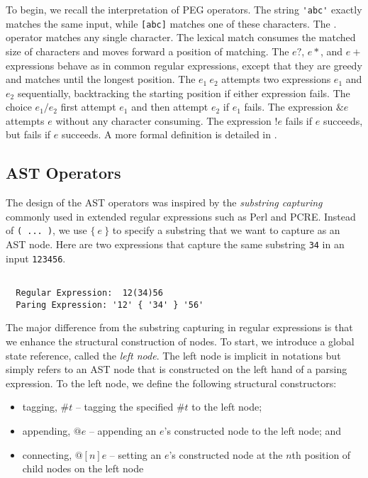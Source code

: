 \documentclass[JIP]{ipsj}
\begin{document}
To begin, we recall the interpretation of PEG operators. The string \verb|'abc'| exactly matches the same input, while \verb|[abc]| matches one of these characters. The . operator matches any single character. The lexical match consumes the matched size of characters and moves forward a position of matching. The $e?$, $e*$, and $e+$ expressions behave as in common regular expressions, except that they are greedy and matches until the longest position. The $e_1 ~ e_2$ attempts two expressions $e_1$ and $e_2$ sequentially, backtracking the starting position if either expression fails.  The choice $e_1 / e_2$ first attempt $e_1$ and then attempt $e_2$ if $e_1$ fails. The expression $\&e$ attempts $e$ without any character consuming. The expression $!e$ fails if $e$ succeeds, but fails if $e$ succeeds. A more formal definition is detailed in \cite{POPL04_PEG}.

\subsection{AST Operators}

The design of the AST operators was inspired by the {\em substring capturing} commonly used in extended regular expressions such as Perl and PCRE\cite{Pcre}. Instead of \verb|( ... )|, we use $\{~e~\}$ to specify a substring that  we want to capture as an AST node. Here are two expressions that capture the same substring \verb|34| in an input \verb|123456|.

{\small \begin{verbatim}

  Regular Expression:  12(34)56
  Paring Expression: '12' { '34' } '56'

\end{verbatim}}

The major difference from the substring capturing in regular expressions is that we enhance the structural construction of nodes. To start, we introduce a global state reference, called the {\em left node}. The left node is implicit in notations but simply refers to an AST node that is constructed on the left hand of a parsing expression. To the left node, we define the following structural constructors:
 
\begin{itemize}
\item tagging, $\#t$ -- tagging the specified $\#t$ to the left node;
\item appending, $@e$ -- appending an $e$'s constructed node to the left node; and
\item connecting, $@[n]e$ -- setting an $e$'s constructed node at the $n$th position of child nodes on the left node
\end{itemize}
\end{document}
